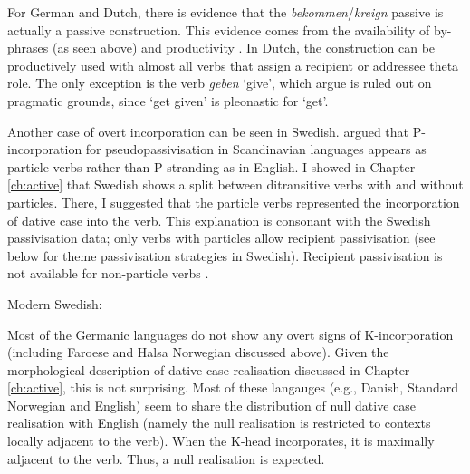 For German and Dutch, there is evidence that the \textit{bekommen}/\textit{kreign} passive is actually a passive construction. This evidence comes from the availability of by-phrases (as seen above) and productivity \citep{Broekhuis.1994,}. In Dutch, the construction can be productively used with almost all verbs that assign a recipient or addressee theta role. The only exception is the verb \textit{geben} `give', which \cite{Broekhuis.1994} argue is ruled out on pragmatic grounds, since `get given' is pleonastic for `get'.

Another case of overt incorporation can be seen in Swedish. \cite{Hersulnd.1984} argued that P-incorporation for pseudopassivisation in Scandinavian languages appears as particle verbs rather than P-stranding as in English. I showed in Chapter \ref{ch:active} that Swedish shows a split between ditransitive verbs with and without particles. There, I suggested that the particle verbs represented the incorporation of dative case into the verb. This explanation is consonant with the Swedish passivisation data; only verbs with particles allow recipient passivisation (see below for theme passivisation strategies in Swedish). Recipient passivisation is not available for non-particle verbs \citep{Lundquist.2006}.

\begin{exe}
	\ex Modern Swedish:
	\begin{xlist}
\end{xlist}	
\end{exe}


Most of the Germanic languages do not show any overt signs of K-incorporation (including Faroese and Halsa Norwegian discussed above). Given the morphological description of dative case realisation discussed in Chapter \ref{ch:active}, this is not surprising. Most of these langauges (e.g., Danish, Standard Norwegian and English) seem to share the distribution of null dative case realisation with English (namely the null realisation is restricted to contexts locally adjacent to the verb). When the K-head incorporates, it is maximally adjacent to the verb. Thus, a null realisation is expected.

